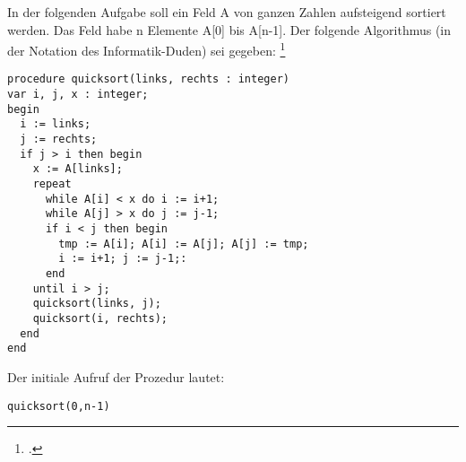 \documentclass{bschlangaul-aufgabe}
\begin{document}

In der folgenden Aufgabe soll ein Feld A von ganzen Zahlen aufsteigend
sortiert werden. Das Feld habe n Elemente A[0] bis A[n-1]. Der folgende
Algorithmus (in der Notation des Informatik-Duden) sei gegeben:
\footcite{examen:66115:2019:09}

\begin{verbatim}
procedure quicksort(links, rechts : integer)
var i, j, x : integer;
begin
  i := links;
  j := rechts;
  if j > i then begin
    x := A[links];
    repeat
      while A[i] < x do i := i+1;
      while A[j] > x do j := j-1;
      if i < j then begin
        tmp := A[i]; A[i] := A[j]; A[j] := tmp;
        i := i+1; j := j-1;:
      end
    until i > j;
    quicksort(links, j);
    quicksort(i, rechts);
  end
end
\end{verbatim}



Der initiale Aufruf der Prozedur lautet:

\begin{verbatim}
quicksort(0,n-1)
\end{verbatim}
\end{document}
